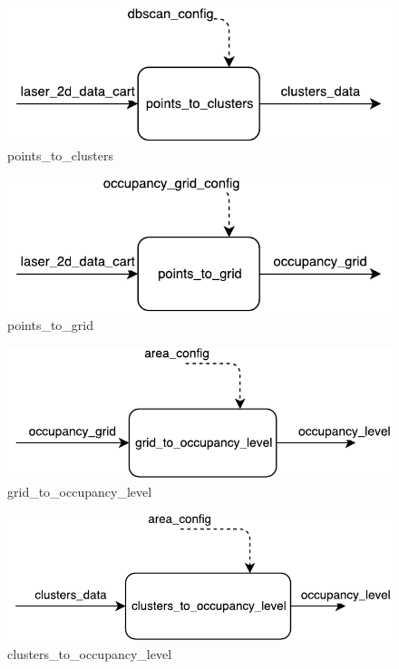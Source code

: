 \begin{description}
\begin{figure}[ht!]
\centering
\includegraphics[scale=0.7]{fig/3/points_to_clusters.pdf}
\caption{points\_to\_clusters}
\label{points_to_clusters}
\end{figure}

\begin{figure}[ht!]
\centering
\includegraphics[scale=0.7]{fig/3/points_to_grid.pdf}
\caption{points\_to\_grid}
\label{points_to_grid}
\end{figure}

\begin{figure}[ht!]
\centering
\includegraphics[scale=0.7]{fig/3/grid_to_occupancy_level.pdf}
\caption{grid\_to\_occupancy\_level}
\label{grid_to_occupancy_level}
\end{figure}

\begin{figure}[ht!]
\centering
\includegraphics[scale=0.7]{fig/3/clusters_to_occupancy_level.pdf}
\caption{clusters\_to\_occupancy\_level}
\label{clusters_to_occupancy_level}
\end{figure}


\end{description}
